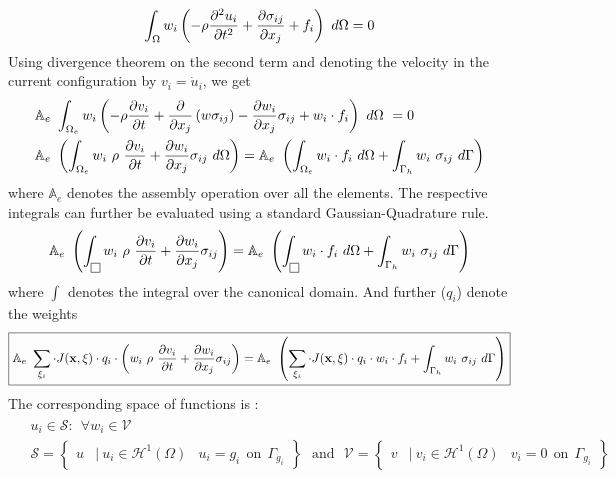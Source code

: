 \begin{align*}
\int_{\Omega}
w_i
\left(
- \rho \deldel{u_i}{t}
+ 
\del{\sigma_{ij}}{x_j}
+ f_i
\right)\ 
d\Omega
=
0
\end{align*} 
Using divergence theorem on the second term and denoting the velocity in the current configuration by $v_i = \dot{u}_i$,  we get
\begin{align*}
& \mathbb{A}_e\ 
 \int_{\Omega_e}
w_i
\left(
-\rho\del{v_i}{t} + 
\del{}{x_j}
\left(
w\sigma_{ij}
\right)
-
\del{w_i}{x_j}\sigma_{ij}
+
w_i \cdot f_i
\right)
\ d\Omega\ 
=0 \\
& \mathbb{A}_e\  
\left( 
\int_{{\Omega_e}}
w_i\  \rho\  \del{v_i}{t}
+
\del{w_i}{x_j}\sigma_{ij} \ d\Omega
\right)
=
\mathbb{A}_e\ 
\left( 
\int_{{\Omega_e}}
w_i\cdot f_i \ d\Omega
+
\int_{{\Gamma_h}}
w_i\ \sigma_{ij}\ d\Gamma
\right)
\end{align*}
where $\mathbb{A}_e$ denotes the assembly operation over all the elements. The respective integrals can further be evaluated using a standard Gaussian-Quadrature rule. 
\begin{align*}
\mathbb{A}_e\  
\left( 
\int_{{\boxed{}}}
w_i\  \rho\  \del{v_i}{t}
+
\del{w_i}{x_j}\sigma_{ij}
\right)
=
\mathbb{A}_e\ 
\left( 
\int_{{\boxed{}}}
w_i\cdot f_i \ d\Omega
+
\int_{{\Gamma_h}}
w_i\ \sigma_{ij}\ d\Gamma
\right)
\end{align*}
where $\int_{\boxed{}}$ denotes the integral over the canonical domain. And further ($q_i$) denote the weights
\begin{align*}
\boxed{\mathbb{A}_e\  
\sum_{\xi_i} \cdot J({\bf x},{\bf\xi})\cdot q_i\cdot
\left( 
w_i\  \rho\  \del{v_i}{t}
+
\del{w_i}{x_j}\sigma_{ij}
\right)
=
\mathbb{A}_e\ 
\left( 
\sum_{\xi_i}\cdot J({\bf x},{\bf\xi})\cdot q_i\cdot
w_i\cdot f_i 
+
\int_{{\Gamma_h}}
w_i\ \sigma_{ij}\ d\Gamma
\right)}
\end{align*}
The corresponding space of functions is : 
\begin{align*}
\boxed{
\begin{aligned}
& u_i \in \mathcal{S} : \ \ \forall w_i \in \mathcal{V} \\
& \mathcal{S} = 
\begin{Bmatrix}
u & |\ u_i \in \mathcal{H}^1 (\Omega) & u_i = g_i \ \ \text{on}\ \ \Gamma_{g_i}
\end{Bmatrix} \ \ \ \text{and} \ \ \ 
\mathcal{V} = 
\begin{Bmatrix}
v & |\ v_i \in \mathcal{H}^1 (\Omega) & v_i = 0 \ \ \text{on}\ \ \Gamma_{g_i}
\end{Bmatrix}
\end{aligned}
}
\end{align*}
